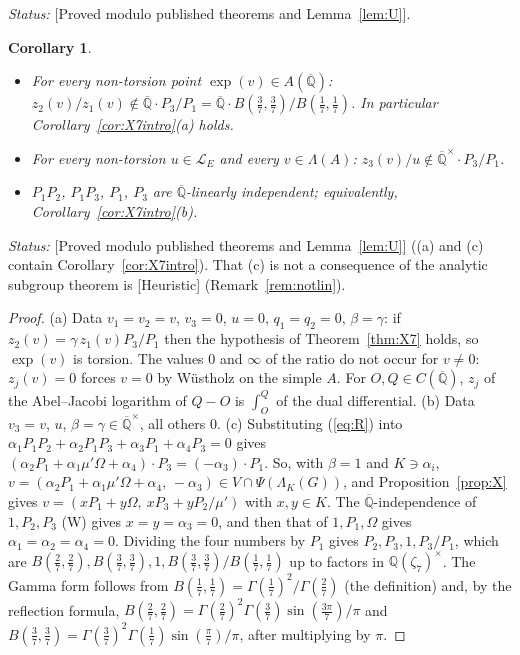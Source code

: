 \documentclass[11pt]{amsart}
\newtheorem{corollary}[theorem]{Corollary}
\theoremstyle{definition}
\newcommand{\Qb}{\overline{\mathbb{Q}}}
\newcommand{\Q}{\mathbb{Q}}
\newcommand{\Lg}{\mathcal{L}}
\newcommand{\lab}[1]{\textup{[#1]}}
\newcommand{\LabC}{\lab{Proved modulo published theorems and Lemma~\ref{lem:U}}}
\newcommand{\Status}{\noindent\emph{Status:} }
\begin{document}
\Status \LabC.

\begin{corollary}\label{cor:X7}
\begin{itemize}
\item[(a)] For every non-torsion point $\exp(v)\in A(\Qb)$: $z_2(v)/z_1(v)\notin\Qb\cdot P_3/P_1=\Qb\cdot
B(\tfrac37,\tfrac37)/B(\tfrac17,\tfrac17)$. In particular Corollary~\ref{cor:X7intro}(a) holds.
\item[(b)] For every non-torsion $u\in\Lg_E$ and every $v\in\Lambda(A)$: $z_3(v)/u\notin\Qb^\times\cdot P_3/P_1$.
\item[(c)] $P_1P_2$, $P_1P_3$, $P_1$, $P_3$ are $\Qb$-linearly independent; equivalently, Corollary~\ref{cor:X7intro}(b).
\end{itemize}
\end{corollary}

\Status \LabC{} ((a) and (c) contain Corollary~\ref{cor:X7intro}). That (c) is not a consequence of the analytic subgroup
theorem is \lab{Heuristic} (Remark~\ref{rem:notlin}).

\begin{proof}
(a) Data $v_1=v_2=v$, $v_3=0$, $u=0$, $q_1=q_2=0$, $\beta=\gamma$: if $z_2(v)=\gamma\,z_1(v)P_3/P_1$ then the hypothesis of
Theorem~\ref{thm:X7} holds, so $\exp(v)$ is torsion. The values $0$ and $\infty$ of the ratio do not occur for $v\ne0$:
$z_j(v)=0$ forces $v=0$ by W\"ustholz on the simple $A$. For $O,Q\in C(\Qb)$, $z_j$ of the Abel--Jacobi logarithm of
$Q-O$ is $\int_O^Q$ of the dual differential. (b) Data $v_3=v$, $u$, $\beta=\gamma\in\Qb^\times$, all others $0$.
(c) Substituting (\ref{eq:R}) into $\alpha_1P_1P_2+\alpha_2P_1P_3+\alpha_3P_1+\alpha_4P_3=0$ gives
$(\alpha_2P_1+\alpha_1\mu'\Omega+\alpha_4)\cdot P_3=(-\alpha_3)\cdot P_1$. So, with $\beta=1$ and $K\ni\alpha_i$,
$v=(\alpha_2P_1+\alpha_1\mu'\Omega+\alpha_4,\,-\alpha_3)\in V\cap\Psi(\Lambda_K(G))$, and Proposition~\ref{prop:X} gives
$v=(xP_1+y\Omega,\ xP_3+yP_2/\mu')$ with $x,y\in K$. The $\Qb$-independence of $1,P_2,P_3$ (W) gives $x=y=\alpha_3=0$, and
then that of $1,P_1,\Omega$ gives $\alpha_1=\alpha_2=\alpha_4=0$. Dividing the four numbers by $P_1$ gives
$P_2,P_3,1,P_3/P_1$, which are $B(\tfrac27,\tfrac27),B(\tfrac37,\tfrac37),1,B(\tfrac37,\tfrac37)/B(\tfrac17,\tfrac17)$ up to
factors in $\Q(\zeta_7)^\times$. The Gamma form follows from $B(\tfrac17,\tfrac17)=\Gamma(\tfrac17)^2/\Gamma(\tfrac27)$ (the
definition) and, by the reflection formula, $B(\tfrac27,\tfrac27)=\Gamma(\tfrac27)^2\Gamma(\tfrac37)\sin(\tfrac{3\pi}7)/\pi$
and $B(\tfrac37,\tfrac37)=\Gamma(\tfrac37)^2\Gamma(\tfrac17)\sin(\tfrac\pi7)/\pi$, after multiplying by $\pi$.
\end{proof}
\end{document}
